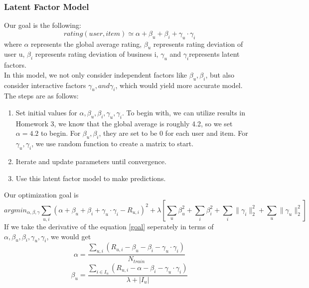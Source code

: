\documentclass[a4paper]{article}
\begin{document}
\subsubsection{Latent Factor Model}
Our goal is the following:
\begin{equation}
rating(user, item) \simeq \alpha + \beta_{u} + \beta_{i} + \gamma_{u} \cdot \gamma_{i}
\end{equation}
where $\alpha$ represents the global average rating, $\beta_{u}$ represents rating deviation of user u, $\beta_{i}$ represents rating deviation of business i, $\gamma_{u}$ and $\gamma_{i}$represents latent factors.\\
In this model, we not only consider independent factors like $\beta_u, \beta_i$, but also consider interactive factors $\gamma_u, and \gamma_i$, which would yield more accurate model.\\
The steps are as follows:\\
\begin{enumerate}
\item Set initial values for $\alpha, \beta_u, \beta_i, \gamma_u, \gamma_i$. To begin with, we can utilize results in Homework 3, we know that the global average is roughly 4.2, so we set $\alpha = 4.2$ to begin. For $\beta_u, \beta_i$, they are set to be 0 for each user and item. For $\gamma_u, \gamma_i$, we use random function to create a matrix to start.
\item Iterate and update parameters until convergence.
\item Use this latent factor model to make predictions.
\end{enumerate}
Our optimization goal is 
\begin{equation}\label{goal}
arg min_{\alpha,\beta,\gamma}\sum_{u,i}(\alpha+\beta_u+\beta_i+\gamma_u \cdot \gamma_i - R_{u,i})^2 + \lambda[\sum_u \beta_u^2 +\sum_i \beta_i^2 + \sum_i \parallel \gamma_i \parallel_2^2 + \sum_u \parallel \gamma_u \parallel_2^2]
\end{equation}
If we take the derivative of the equation \ref{goal} seperately in terms of $\alpha, \beta_u, \beta_i, \gamma_u, \gamma_i$, we would get
\begin{equation}
\alpha = \frac{\sum_{u,i}(R_{u,i}-\beta_u-\beta_i-\gamma_u \cdot \gamma_i)}{N_{train}}
\end{equation}
\begin{equation}
\beta_u = \frac{\sum_{i \in I_u}(R_{u,i}-\alpha-\beta_i-\gamma_u \cdot \gamma_i)}{\lambda + \left| I_u \right|}
\end{equation}
\end{document}
